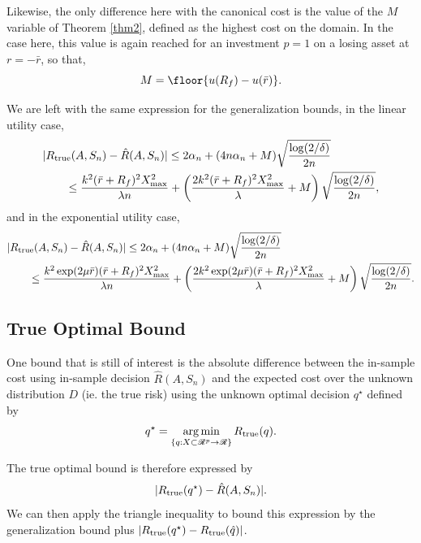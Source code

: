 \begin{rem}
  Likewise, the only difference here with the canonical cost is the value of the $M$
  variable of Theorem \ref{thm2}, defined as the highest cost on the domain. In the case
  here, this value is again reached for an investment $p=1$ on a losing asset at $r=-\bar
  r$, so that,
  \begin{equation*}
    M = \floor{u(R_f) - u(\bar r)}.
  \end{equation*}

  We are left with the same expression for the generalization bounds, in the linear
  utility case,
  \begin{align*}
    &|R_{\mathrm{true}}(A,S_n) - \hat{R}(A,S_n)| \leq 2\alpha_n + (4n\alpha_n +
      M)\sqrt{\frac{\log(2/\delta)}{2n}}\\
    &\qquad \leq \frac{k^2(\bar r+R_f)^2X^2_{\max}}{\lambda n} + \left(\frac{2k^2(\bar r+R_f)^2X^2_{\max}}{\lambda} + M\right)\sqrt{\frac{\log(2/\delta)}{2n}},
  \end{align*}
  and in the exponential utility case, 
  \begin{align*}
    &|R_{\mathrm{true}}(A,S_n) - \hat{R}(A,S_n)| \leq 2\alpha_n + (4n\alpha_n +
      M)\sqrt{\frac{\log(2/\delta)}{2n}}\\
    &\qquad \leq \frac{k^2 \exp(2\mu\bar r)(\bar r + R_f)^2 X^2_{\max}}{\lambda n} + \left(\frac{2k^2 \exp(2\mu\bar r)(\bar r + R_f)^2 X^2_{\max}}{\lambda} + M\right)\sqrt{\frac{\log(2/\delta)}{2n}}.
  \end{align*}
\end{rem}

\subsection{True Optimal Bound}

One bound that is still of interest is the absolute difference between the in-sample cost
using in-sample decision $\hat R(A,S_n)$ and the expected cost over the unknown
distribution $D$ (ie. the true risk) using the unknown optimal decision $q^\star$ defined
by
\begin{equation*}
  q^\star = \operatorname*{arg\,min}_{\{q:X\subset\mathscr{R}^p\to\mathscr{R}\}}R_{\mathrm{true}}(q).
\end{equation*}

The true optimal bound is therefore expressed by
\begin{equation*}
|R_{\mathrm{true}}(q^\star) - \hat R(A,S_n)|.  
\end{equation*}
We can then apply the triangle inequality to bound this expression by the generalization
bound plus $|R_{\mathrm{true}}(q^\star) - R_{\mathrm{true}}(\hat q)|$. 

